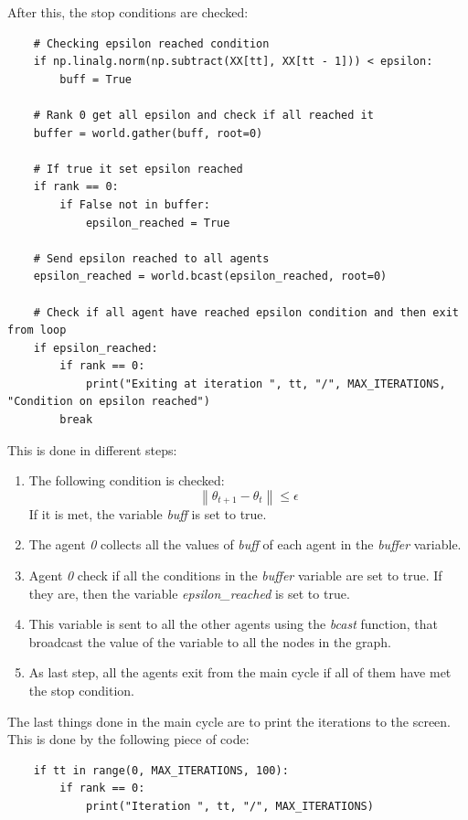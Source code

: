 \documentclass[a4paper,11pt,oneside]{book}
\begin{document}
After this, the stop conditions are checked:
\begin{lstlisting}
    # Checking epsilon reached condition
    if np.linalg.norm(np.subtract(XX[tt], XX[tt - 1])) < epsilon:
        buff = True

    # Rank 0 get all epsilon and check if all reached it
    buffer = world.gather(buff, root=0)

    # If true it set epsilon reached
    if rank == 0:
        if False not in buffer:
            epsilon_reached = True

    # Send epsilon reached to all agents
    epsilon_reached = world.bcast(epsilon_reached, root=0)

    # Check if all agent have reached epsilon condition and then exit from loop
    if epsilon_reached:
        if rank == 0:
            print("Exiting at iteration ", tt, "/", MAX_ITERATIONS, "Condition on epsilon reached")
        break
\end{lstlisting}

This is done in different steps:
\begin{enumerate}
	\item The following condition is checked:
	\begin{equation}
		\left\lVert \theta_{t+1} - \theta_{t} \right\rVert
		\leq \epsilon
	\end{equation}
	If it is met, the variable \textit{buff} is set to true. 
	\item The agent \textit{0} collects all the values of \textit{buff} of each agent in the \textit{buffer} variable.
	\item Agent \textit{0} check if all the conditions in the \textit{buffer} variable are set to true. If they are, then the variable \textit{epsilon\_reached} is set to true.
	\item This variable is sent to all the other agents using the \textit{bcast} function, that broadcast the value of the variable to all the nodes in the graph.
	\item As last step, all the agents exit from the main cycle if all of them have met the stop condition. 
\end{enumerate}

The last things done in the main cycle are to print the iterations to the screen. This is done by the following piece of code:
\begin{lstlisting}
    if tt in range(0, MAX_ITERATIONS, 100):
        if rank == 0:
            print("Iteration ", tt, "/", MAX_ITERATIONS)
\end{lstlisting}
\end{document}

